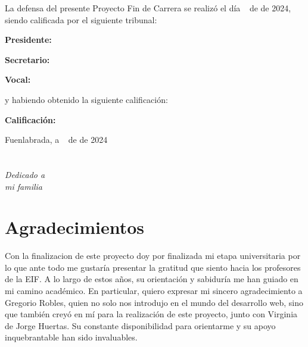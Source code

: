 \documentclass[a4paper, 12pt]{book}
\begin{document}
\vspace{1cm}
La defensa del presente Proyecto Fin de Carrera se realizó el día \qquad$\;\,$ de \qquad\qquad\qquad\qquad \newline de 2024, siendo calificada por el siguiente tribunal:


\vspace{0.5cm}
\textbf{Presidente:}

\vspace{1.2cm}
\textbf{Secretario:}

\vspace{1.2cm}
\textbf{Vocal:}


\vspace{1.2cm}
y habiendo obtenido la siguiente calificación:

\vspace{1cm}
\textbf{Calificación:}


\vspace{1cm}
\begin{flushright}
Fuenlabrada, a \qquad$\;\,$ de \qquad\qquad\qquad\qquad de 2024
\end{flushright}


\chapter*{}
\begin{flushright}
\textit{Dedicado a \\
mi familia}
\end{flushright}


\chapter*{Agradecimientos}

Con la finalizacion de este proyecto doy por finalizada mi etapa universitaria por lo que 
ante todo me gustaría presentar la gratitud que siento hacia los profesores de la EIF. A 
lo largo de estos años, su orientación y sabiduría me han guiado en mi camino académico. 
En particular, quiero expresar mi sincero agradecimiento a Gregorio Robles, quien no solo nos 
introdujo en el mundo del desarrollo web, sino que también creyó en mí para la realización de 
este proyecto, junto con Virginia de Jorge Huertas. Su constante disponibilidad para orientarme 
y su apoyo inquebrantable han sido invaluables.
\end{document}
